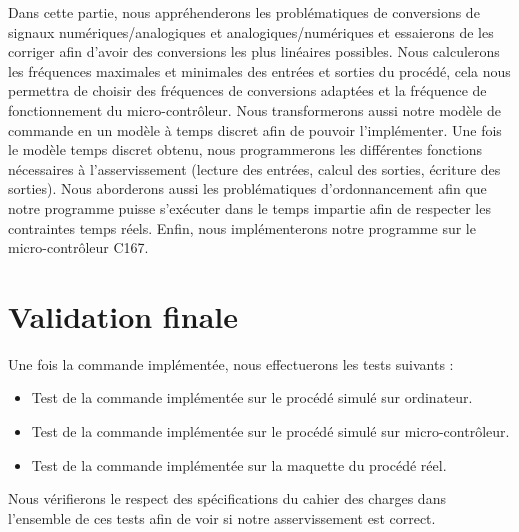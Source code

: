 Dans cette partie, nous appréhenderons les problématiques de conversions de signaux numériques/analogiques et analogiques/numériques et essaierons de les corriger afin d'avoir des conversions les plus linéaires possibles. Nous calculerons les fréquences maximales et minimales des entrées et sorties du procédé, cela nous permettra de choisir des fréquences de conversions adaptées et la fréquence de fonctionnement du micro-contrôleur. Nous transformerons aussi notre modèle de commande en un modèle à temps discret afin de pouvoir l'implémenter. Une fois le modèle temps discret obtenu, nous programmerons les différentes fonctions nécessaires à l'asservissement (lecture des entrées, calcul des sorties, écriture des sorties). Nous aborderons aussi les problématiques d'ordonnancement afin que notre programme puisse s'exécuter dans le temps impartie afin de respecter les contraintes temps réels. Enfin, nous implémenterons notre programme sur le micro-contrôleur C167.
\section{Validation finale}
Une fois la commande implémentée, nous effectuerons les tests suivants : 
\begin{itemize}
\item Test de la commande implémentée sur le procédé simulé sur ordinateur.
\item Test de la commande implémentée sur le procédé simulé sur micro-contrôleur.
\item Test de la commande implémentée sur la maquette du procédé réel.
\end{itemize}

Nous vérifierons le respect des spécifications du cahier des charges dans l'ensemble de ces tests afin de voir si notre asservissement est correct.